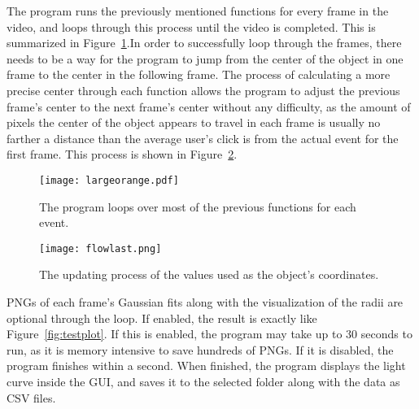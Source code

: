 The program runs the previously mentioned functions for every frame in the video, and loops through this process until the video is completed. This is summarized in Figure~\ref{fig:moreflow}.In order to successfully loop through the frames, there needs to be a way for the program to jump from the center of the object in one frame to the center in the following frame. The process of calculating a more precise center through each function allows the program to adjust the previous frame's center to the next frame's center without any difficulty, as the amount of pixels the center of the object appears to travel in each frame is usually no farther a distance than the average user's click is from the actual event for the first frame. This process is shown in Figure~\ref{fig:updatingxy}.

\begin{figure}[ht!]
	\centering
	\texttt{[image: largeorange.pdf]}
	\caption{The program loops over most of the previous functions for each event.}
	\label{fig:moreflow}
\end{figure}

\begin{figure}[htpb]
	\centering
	\texttt{[image: flowlast.png]}
	\caption{The updating process of the values used as the object's coordinates.}
	\label{fig:updatingxy}
\end{figure}

PNGs of each frame's Gaussian fits along with the visualization of the radii are optional through the loop. If enabled, the result is exactly like Figure~\ref{fig:testplot}. If this is enabled, the program may take up to 30 seconds to run, as it is memory intensive to save hundreds of PNGs. If it is disabled, the program finishes within a second. When finished, the program displays the light curve inside the GUI, and saves it to the selected folder along with the data as CSV files.

